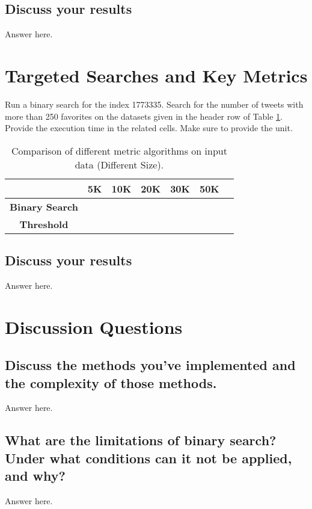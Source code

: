 \subsection*{Discuss your results}
Answer here. 

\section{Targeted Searches and Key Metrics}

Run a binary search for the index 1773335. Search for the number of tweets with more than 250 favorites on the datasets given in the header row of Table \ref{dataSizeMetric}. Provide the execution time in the related cells. Make sure to provide the unit. 

\begin{table}[h!]
\centering
\begin{tabular}{|c|c|c|c|c|c|c|}
\hline
                        & \textbf{5K} & \textbf{10K} & \textbf{20K} & \textbf{30K} & \textbf{50K} \\ \hline
\textbf{Binary Search}  &             &              &              &              &              \\ \hline
\textbf{Threshold}      &             &              &              &              &              \\ \hline
\end{tabular}
\caption{Comparison of different metric algorithms on input data (Different Size). }
\label{dataSizeMetric}
\end{table}

\subsection*{Discuss your results}
Answer here. 

\section{Discussion Questions}

\subsection*{Discuss the methods you've implemented and the complexity of those methods.}
Answer here. 

\subsection*{What are the limitations of binary search? Under what conditions can it not be applied, and why?}
Answer here. 

